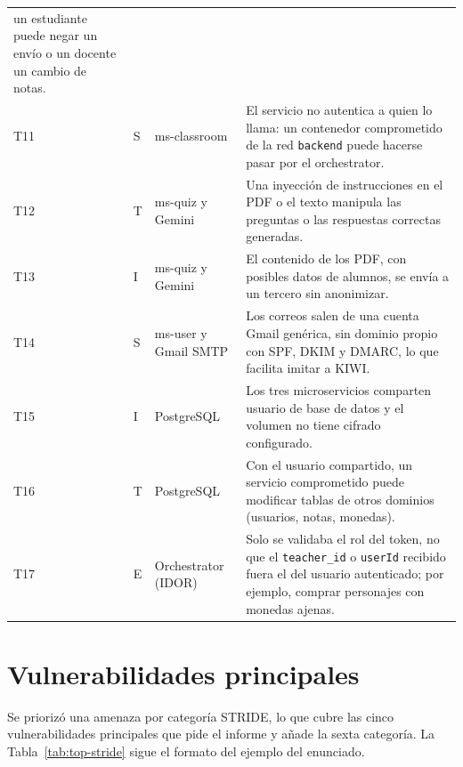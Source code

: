 \documentclass[12pt,a4paper]{article}
\begin{document}
{\begin{longtable}{L{0.8cm}L{0.6cm}L{3.3cm}L{9.6cm}}
  un estudiante puede negar un envío o un docente un cambio de notas. \\
  T11 & S & ms-classroom & El servicio no autentica a quien lo llama: un contenedor comprometido
  de la red \texttt{backend} puede hacerse pasar por el orchestrator. \\
  T12 & T & ms-quiz y Gemini & Una inyección de instrucciones en el PDF o el texto manipula las
  preguntas o las respuestas correctas generadas. \\
  T13 & I & ms-quiz y Gemini & El contenido de los PDF, con posibles datos de alumnos, se envía
  a un tercero sin anonimizar. \\
  T14 & S & ms-user y Gmail SMTP & Los correos salen de una cuenta Gmail genérica, sin dominio
  propio con SPF, DKIM y DMARC, lo que facilita imitar a KIWI. \\
  T15 & I & PostgreSQL & Los tres microservicios comparten usuario de base de datos y el volumen
  no tiene cifrado configurado. \\
  T16 & T & PostgreSQL & Con el usuario compartido, un servicio comprometido puede modificar tablas
  de otros dominios (usuarios, notas, monedas). \\
  T17 & E & Orchestrator (IDOR) & Solo se validaba el rol del token, no que el
  \texttt{teacher\_id} o \texttt{userId} recibido fuera el del usuario autenticado; por ejemplo,
  comprar personajes con monedas ajenas. \\
\end{longtable}
}

\section{Vulnerabilidades principales}
\label{sec:vulnerabilidades}

Se priorizó una amenaza por categoría STRIDE, lo que cubre las cinco vulnerabilidades principales
que pide el informe y añade la sexta categoría. La Tabla~\ref{tab:top-stride} sigue el formato del
ejemplo del enunciado.
\end{document}
